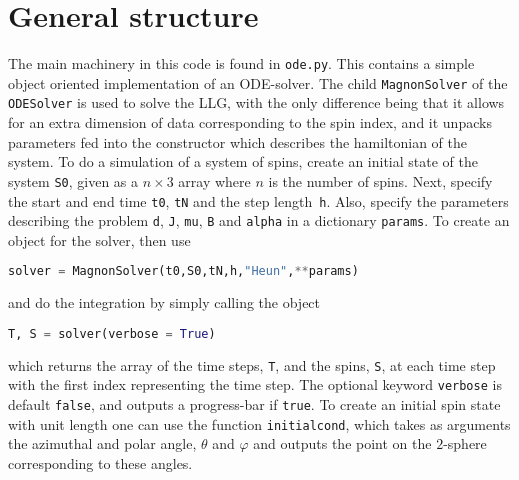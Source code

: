 \section{General structure}

The main machinery in this code is found in \texttt{ode.py}. This contains a simple object oriented implementation of an ODE-solver. The child \texttt{MagnonSolver} of the \texttt{ODESolver} is used to solve the LLG, with the only difference being that it allows for an extra dimension of data corresponding to the spin index, and it unpacks parameters fed into the constructor which describes the hamiltonian of the system. To do a simulation of a system of spins, create an initial state of the system \texttt{S0}, given as a $n\times3$ array where $n$ is the number of spins. Next, specify the start and end time \texttt{t0}, \texttt{tN} and the step length \texttt{h}. Also, specify the parameters describing the problem \texttt{d}, \texttt{J}, \texttt{mu}, \texttt{B} and \texttt{alpha} in a dictionary \texttt{params}. To create an object for the solver, then use

\begin{lstlisting}[language=Python]
solver = MagnonSolver(t0,S0,tN,h,"Heun",**params)
\end{lstlisting}
 
and do the integration by simply calling the object

\begin{lstlisting}[language=Python]
T, S = solver(verbose = True)
\end{lstlisting}

which returns the array of the time steps, \texttt{T}, and the spins, \texttt{S}, at each time step with the first index representing the time step. The optional keyword \texttt{verbose} is default \texttt{false}, and outputs a progress-bar if \texttt{true}. To create an initial spin state with unit length one can use the function \texttt{initial\textunderscore cond}, which takes as arguments the azimuthal and polar angle, $\theta$ and $\varphi$ and outputs the point on the $2$-sphere corresponding to these angles. 

